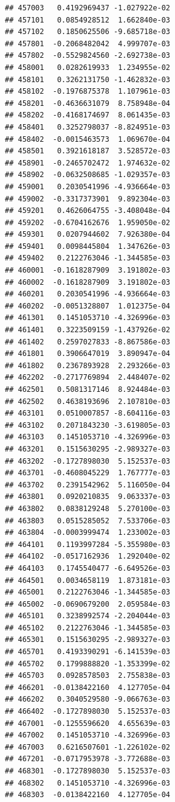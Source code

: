 \documentclass[ignorenonframetext,]{beamer}
\begin{document}
\begin{frame}[fragile]
\begin{verbatim}
## 457003   0.4192969437 -1.027922e-02
## 457101   0.0854928512  1.662840e-03
## 457102   0.1850625506 -9.685718e-03
## 457801  -0.2068482042  4.999707e-03
## 457802  -0.5529824560 -2.692738e-03
## 458001   0.0282619933  1.234955e-02
## 458101   0.3262131750 -1.462832e-03
## 458102  -0.1976875378  1.107961e-03
## 458201  -0.4636631079  8.758948e-04
## 458202  -0.4168174697  8.061435e-03
## 458401   0.3252798037 -8.824951e-03
## 458402  -0.0015463573  1.069670e-04
## 458501   0.3921618187  3.528572e-03
## 458901  -0.2465702472  1.974632e-02
## 458902  -0.0632508685 -1.029357e-03
## 459001   0.2030541996 -4.936664e-03
## 459002  -0.3317373901  9.892304e-03
## 459201   0.4626064755 -3.408048e-04
## 459202  -0.6704162676  1.959050e-02
## 459301   0.0207944602  7.926380e-04
## 459401   0.0098445804  1.347626e-03
## 459402   0.2122763046 -1.344585e-03
## 460001  -0.1618287909  3.191802e-03
## 460002  -0.1618287909  3.191802e-03
## 460201   0.2030541996 -4.936664e-03
## 460202  -0.0051328807  1.012375e-04
## 461301   0.1451053710 -4.326996e-03
## 461401   0.3223509159 -1.437926e-02
## 461402   0.2597027833 -8.867586e-03
## 461801   0.3906647019  3.890947e-04
## 461802   0.2367893928  2.293266e-03
## 462202  -0.2717769894  2.448407e-02
## 462501   0.5081317146  8.924484e-03
## 462502   0.4638193696  2.107810e-03
## 463101   0.0510007857 -8.604116e-03
## 463102   0.2071843230 -3.619805e-03
## 463103   0.1451053710 -4.326996e-03
## 463201   0.1515630295 -2.989327e-03
## 463202  -0.1727898030  5.152537e-03
## 463701  -0.4608045229  1.767777e-03
## 463702   0.2391542962  5.116050e-04
## 463801   0.0920210835  9.063337e-03
## 463802   0.0838129248  5.270100e-03
## 463803   0.0515285052  7.533706e-03
## 463804  -0.0003999474  1.233002e-03
## 464101   0.1193997284 -5.355980e-03
## 464102  -0.0517162936  1.292040e-02
## 464103   0.1745540477 -6.649526e-03
## 464501   0.0034658119  1.873181e-03
## 465001   0.2122763046 -1.344585e-03
## 465002  -0.0690679200  2.059584e-03
## 465101   0.3238992574 -2.204044e-03
## 465102   0.2122763046 -1.344585e-03
## 465301   0.1515630295 -2.989327e-03
## 465701   0.4193390291 -6.141539e-03
## 465702   0.1799888820 -1.353399e-02
## 465703   0.0928578503  2.755838e-03
## 466201  -0.0138422160  4.127705e-04
## 466202   0.3040529580 -9.066763e-03
## 466402  -0.1727898030  5.152537e-03
## 467001  -0.1255596620  4.655639e-03
## 467002   0.1451053710 -4.326996e-03
## 467003   0.6216507601 -1.226102e-02
## 467201  -0.0717953978 -3.772688e-03
## 468301  -0.1727898030  5.152537e-03
## 468302   0.1451053710 -4.326996e-03
## 468303  -0.0138422160  4.127705e-04

\end{verbatim}
\end{frame}
\end{document}
